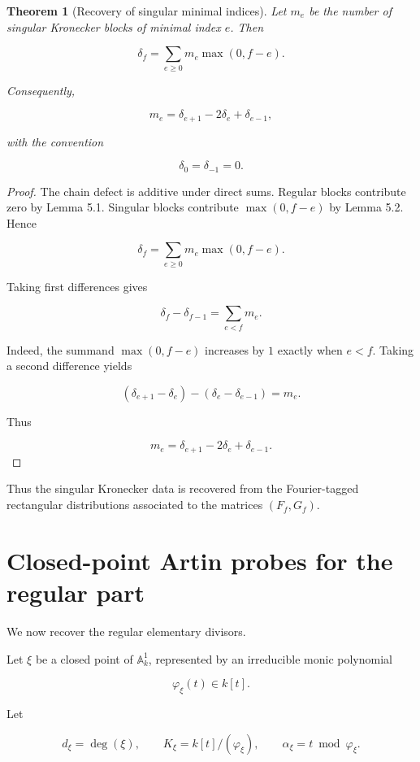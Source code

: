 \documentclass[11pt]{article}
\newtheorem{theorem}{Theorem}[section]
\begin{document}
\begin{theorem}[Recovery of singular minimal indices]

Let $m_e$ be the number of singular Kronecker blocks of minimal index $e$. Then

\[
\boxed{
\delta_f
=
\sum_{e\ge0}m_e\max(0,f-e).
}
\]

Consequently,

\[
\boxed{
m_e=\delta_{e+1}-2\delta_e+\delta_{e-1},
}
\]

with the convention

\[
\delta_0=\delta_{-1}=0.
\]

\end{theorem}

\begin{proof}

The chain defect is additive under direct sums. Regular blocks contribute zero by Lemma 5.1. Singular blocks contribute $\max(0,f-e)$ by Lemma 5.2. Hence

\[
\delta_f
=
\sum_{e\ge0}m_e\max(0,f-e).
\]

Taking first differences gives

\[
\delta_f-\delta_{f-1}
=
\sum_{e<f}m_e.
\]

Indeed, the summand $\max(0,f-e)$ increases by $1$ exactly when $e<f$. Taking a second difference yields

\[
(\delta_{e+1}-\delta_e)-(\delta_e-\delta_{e-1})
=
m_e.
\]

Thus

\[
\boxed{
m_e=\delta_{e+1}-2\delta_e+\delta_{e-1}.
}
\]

\end{proof}

Thus the singular Kronecker data is recovered from the Fourier-tagged rectangular distributions associated to the matrices $(F_f,G_f)$.

\section{Closed-point Artin probes for the regular part}

We now recover the regular elementary divisors.

Let $\xi$ be a closed point of $\mathbb A^1_k$, represented by an irreducible monic polynomial

\[
\varphi_\xi(t)\in k[t].
\]

Let

\[
d_\xi=\deg(\xi),
\qquad
K_\xi=k[t]/(\varphi_\xi),
\qquad
\alpha_\xi=t\bmod\varphi_\xi.
\]
\end{document}
